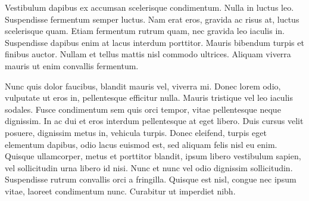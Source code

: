 Vestibulum dapibus ex accumsan scelerisque condimentum. Nulla in luctus leo. Suspendisse fermentum semper luctus. Nam erat eros, gravida ac risus at, luctus scelerisque quam. Etiam fermentum rutrum quam, nec gravida leo iaculis in. Suspendisse dapibus enim at lacus interdum porttitor. Mauris bibendum turpis et finibus auctor. Nullam et tellus mattis nisl commodo ultrices. Aliquam viverra mauris ut enim convallis fermentum.

Nunc quis dolor faucibus, blandit mauris vel, viverra mi. Donec lorem odio, vulputate ut eros in, pellentesque efficitur nulla. Mauris tristique vel leo iaculis sodales. Fusce condimentum sem quis orci tempor, vitae pellentesque neque dignissim. In ac dui et eros interdum pellentesque at eget libero. Duis cursus velit posuere, dignissim metus in, vehicula turpis. Donec eleifend, turpis eget elementum dapibus, odio lacus euismod est, sed aliquam felis nisl eu enim. Quisque ullamcorper, metus et porttitor blandit, ipsum libero vestibulum sapien, vel sollicitudin urna libero id nisi. Nunc et nunc vel odio dignissim sollicitudin. Suspendisse rutrum convallis orci a fringilla. Quisque est nisl, congue nec ipsum vitae, laoreet condimentum nunc. Curabitur ut imperdiet nibh.
